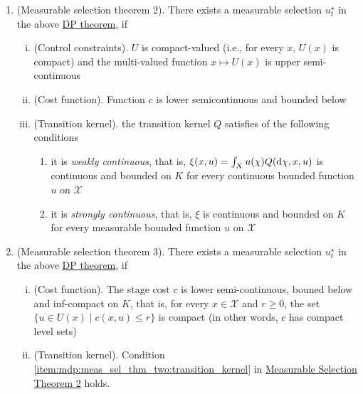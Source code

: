 \documentclass[a4paper,10pt]{scrbook}
\begin{document}
\begin{enumerate}
       
  \item \label{item:mdp:meas_sel_thm_two} 
  (\hypertarget{link:mst2}{Measurable selection theorem 2}). 
       There exists a measurable selection \(u_t^\star\) 
       in the above \hyperlink{link:dp_thm}{DP theorem}, if 
       \begin{enumerate}[i.]
        \item (Control constraints). \(U\) is compact-valued (i.e., for every \(x\), \(U(x)\) is compact)
              and the multi-valued function \(x\mapsto U(x)\) is upper semi-continuous
        \item (Cost function). Function \(c\) is lower semicontinuous and bounded below
        \item \label{item:mdp:meas_sel_thm_two:transition_kernel} 
              (Transition kernel). the transition kernel \(Q\) satisfies of the following conditions
              \begin{enumerate}
               \item it is \textit{weakly continuous}, that is, \(\xi(x,u) = \int_X u(\chi) Q(\mathrm{d} \chi, x, u)\)
                     is continuous and bounded on \(K\) for every continuous bounded function \(u\) on \(\mathcal{X}\)
               \item it is \textit{strongly continuous}, that is, \(\xi\) is continuous and bounded on \(K\)
                     for every measurable bounded function \(u\) on \(\mathcal{X}\)
              \end{enumerate}
       \end{enumerate} 
       
 \item (\hypertarget{link:mst3}{Measurable selection theorem 3}). There exists a measurable selection \(u_t^\star\) 
       in the above \hyperlink{link:dp_thm}{DP theorem}, if 
       \begin{enumerate}[i.]
        \item (Cost function). The stage cost \(c\) is lower semi-continuous, bouned below and inf-compact
               on \(K\), that is, for every \(x\in \mathcal{X}\) and \(r\geq 0\), the set 
               \(\{u\in U(x) {}\mid{} c(x,u)\leq r\}\) is compact (in other words, \(c\) has compact 
               level sets)
        \item (Transition kernel). Condition \ref{item:mdp:meas_sel_thm_two:transition_kernel} in 
              \hyperlink{link:mst2}{Measurable Selection Theorem 2} holds.
        \end{enumerate}
\end{enumerate}
\end{document}
